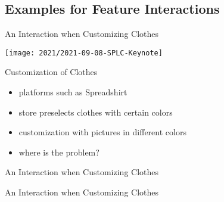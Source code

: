 \subsection{Examples for Feature Interactions}

\begin{frame}{An Interaction when Customizing Clothes}
	\begin{mycolumns}[widths={66}]
		\texttt{[image: 2021/2021-09-08-SPLC-Keynote]}
	\mynextcolumn
		\begin{example}{Customization of Clothes}
			\begin{itemize}
			\item platforms such as Spreadshirt
			\item store preselects clothes with certain colors
			\item customization with pictures in different colors
			\item where is the problem?
			\end{itemize}
		\end{example}
	\end{mycolumns}
\end{frame}
\begin{frame}{An Interaction when Customizing Clothes}
	\begin{mycolumns}%
	\mynextcolumn
	\end{mycolumns}
\end{frame}
\begin{frame}{An Interaction when Customizing Clothes}
	\begin{mycolumns}
	\mynextcolumn
	\end{mycolumns}
\end{frame}

